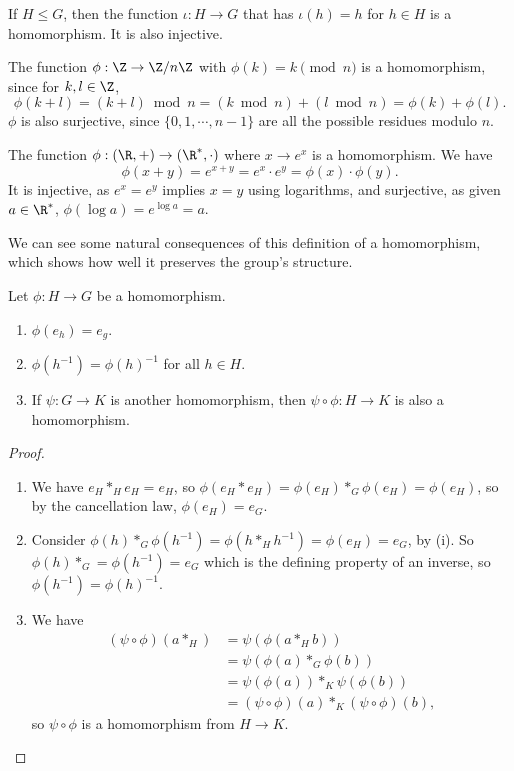 \begin{example}
	If $H \leq G$, then the function $\iota : H \rightarrow G$ that has $\iota(h) = h$ for $h \in H$ is a homomorphism. It is also injective.
\end{example}

\begin{example}
	The function $\phi : \Z\rightarrow \Z/n\Z$ with $\phi(k) = k \pmod{n}$ is a homomorphism, since for $k, l \in \Z$,
	$$
\phi(k + l) = (k + l) \bmod{n} = (k \bmod{n}) + (l \bmod{n}) = \phi(k) + \phi(l).
	$$
	$\phi$ is also surjective, since $\{0, 1, \cdots, n - 1\}$ are all the possible residues modulo $n$.
\end{example}

\begin{example}
	The function $\phi : (\R, + )\rightarrow (\R^*, \cdot)$ where $x \rightarrow e^x$ is a homomorphism. We have
	$$
	\phi(x + y) = e^{x + y} = e^x \cdot e^y = \phi(x) \cdot \phi(y).
	$$
	It is injective, as $e^x = e^y$ implies $x = y$ using logarithms, and surjective, as given $a \in \R^*$, $\phi(\log a) = e^{\log a} = a$.
\end{example}

We can see some natural consequences of this definition of a homomorphism, which shows how well it preserves the group's structure.

\begin{proposition}
	Let $\phi : H \rightarrow G$ be a homomorphism.
	\begin{enumerate}[label=(\roman*)]
		\item $\phi(e_h) = e_g$. 
		\item $\phi(h^{-1}) = \phi(h)^{-1}$ for all $h \in H$.
		\item If $\psi : G \rightarrow K$ is another homomorphism, then $\psi \circ \phi : H \rightarrow K$ is also a homomorphism.
	\end{enumerate}
\end{proposition}
\begin{proof}
	$ $ \phantom{\qedhere}
	\begin{enumerate}[label=(\roman*)]
		\item We have $e_H *_H e_H = e_H$, so $\phi(e_H * e_H) = \phi(e_H) *_G \phi(e_H) = \phi(e_H)$, so by the cancellation law, $\phi(e_H) = e_G$.
		\item Consider $\phi(h) *_G \phi(h^{-1}) = \phi(h *_H h^{-1}) = \phi(e_H) = e_G$, by (i). So $\phi(h) *_G = \phi(h^{-1}) = e_G$ which is the defining property of an inverse, so $\phi(h^{-1}) = \phi(h)^{-1}$.
		\item We have 
		\begin{align*}
			(\psi \circ \phi)(a *_H) &= \psi(\phi(a *_H b))\\
									 &= \psi(\phi(a) *_G \phi(b))\\ 
									 &= \psi(\phi(a)) *_K \psi(\phi(b)) \\
									 &= (\psi \circ \phi)(a) *_K (\psi \circ \phi)(b),
		\end{align*}
		so $\psi \circ \phi$ is a homomorphism from $H \rightarrow K$.\hfill \qedsymbol
	\end{enumerate}
\end{proof}


